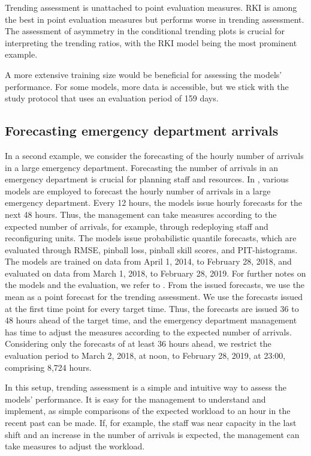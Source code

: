 Trending assessment is unattached to point evaluation measures.
RKI is among the best in point evaluation measures but performs worse in trending assessment.
The assessment of asymmetry in the conditional trending plots is crucial for interpreting the trending ratios, with the RKI model being the most prominent example.

A more extensive training size would be beneficial for assessing the models' performance.
For some models, more data is accessible, but we stick with the study protocol that uses an evaluation period of 159 days.

\subsection{Forecasting emergency department arrivals}\label{sec:application-eda}

In a second example, we consider the forecasting of the hourly number of arrivals in a large emergency department.
Forecasting the number of arrivals in an emergency department is crucial for planning staff and resources.
In \textcite{Rostami-Tabar2023}, various models are employed to forecast the hourly number of arrivals in a large emergency department.
Every 12 hours, the models issue hourly forecasts for the next 48 hours.
Thus, the management can take measures according to the expected number of arrivals, for example, through redeploying staff and reconfiguring units.
The models issue probabilistic quantile forecasts, which are evaluated through RMSE, pinball loss, pinball skill scores, and PIT-histograms.
The models are trained on data from April 1, 2014, to February 28, 2018, and evaluated on data from March 1, 2018, to February 28, 2019.
For further notes on the models and the evaluation, we refer to \textcite{Rostami-Tabar2023}.
From the issued forecasts, we use the mean as a point forecast for the trending assessment.
We use the forecasts issued at the first time point for every target time.
Thus, the forecasts are issued 36 to 48 hours ahead of the target time, and the emergency department management has time to adjust the measures according to the expected number of arrivals.
Considering only the forecasts of at least 36 hours ahead, we restrict the evaluation period to March 2, 2018, at noon, to February 28, 2019, at 23:00, comprising 8,724 hours.

In this setup, trending assessment is a simple and intuitive way to assess the models' performance.
It is easy for the management to understand and implement, as simple comparisons of the expected workload to an hour in the recent past can be made.
If, for example, the staff was near capacity in the last shift and an increase in the number of arrivals is expected, the management can take measures to adjust the workload.

